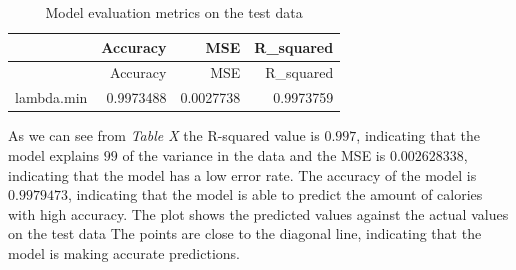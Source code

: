 \documentclass[
]{article}
\begin{document}
\begin{longtable}[]{@{}lrrr@{}}
\caption{Model evaluation metrics on the test data}\tabularnewline
\toprule\noalign{}
& Accuracy & MSE & R\_squared \\
\midrule\noalign{}
\endfirsthead
\toprule\noalign{}
& Accuracy & MSE & R\_squared \\
\midrule\noalign{}
\endhead
\bottomrule\noalign{}
\endlastfoot
lambda.min & 0.9973488 & 0.0027738 & 0.9973759 \\
\end{longtable}

As we can see from \emph{Table X} the R-squared value is \(0.997\),
indicating that the model explains \(99%
\) of the variance in the data and the MSE is \(0.002628338\),
indicating that the model has a low error rate. The accuracy of the
model is \(0.9979473\), indicating that the model is able to predict the
amount of calories with high accuracy. The plot shows the predicted
values against the actual values on the test data The points are close
to the diagonal line, indicating that the model is making accurate
predictions.
\end{document}
